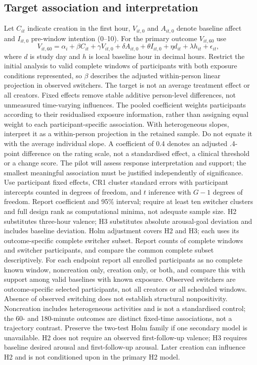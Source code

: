 \documentclass[11pt]{article}
\begin{document}
\subsection{Target association and interpretation}
Let $C_{it}$ indicate creation in the first hour, $V_{it,0}$ and $A_{it,0}$ denote baseline affect and $I_{it,0}$ pre-window intention (0--10). For the primary outcome $V_{it,60}$ use
\[
V_{it,60}=\alpha_i+\beta C_{it}+\gamma V_{it,0}+
\delta A_{it,0}+\theta I_{it,0}+\eta d_{it}+\lambda h_{it}+\epsilon_{it},
\]
where $d$ is study day and $h$ is local baseline hour in decimal hours. Restrict the initial analysis to valid complete windows of participants with both exposure conditions represented, so $\beta$ describes the adjusted within-person linear projection in observed switchers. The target is not an average treatment effect or all creators. Fixed effects remove stable additive person-level differences, not unmeasured time-varying influences. The pooled coefficient weights participants according to their residualised exposure information, rather than assigning equal weight to each participant-specific association. With heterogeneous slopes, interpret it as a within-person projection in the retained sample. Do not equate it with the average individual slope. A coefficient of 0.4 denotes an adjusted .4-point difference on the rating scale, not a standardised effect, a clinical threshold or a change score. The pilot will assess response interpretation and support; the smallest meaningful association must be justified independently of significance. Use participant fixed effects, CR1 cluster standard errors with participant intercepts counted in degrees of freedom, and $t$ inference with $G-1$ degrees of freedom. Report coefficient and 95\% interval; require at least ten switcher clusters and full design rank as computational minima, not adequate sample size. H2 substitutes three-hour valence; H3 substitutes absolute arousal-goal deviation and includes baseline deviation. Holm adjustment covers H2 and H3; each uses its outcome-specific complete switcher subset. Report counts of complete windows and switcher participants, and compare the common complete subset descriptively. For each endpoint report all enrolled participants as no complete known window, noncreation only, creation only, or both, and compare this with support among valid baselines with known exposure. Observed switchers are outcome-specific selected participants, not all creators or all scheduled windows. Absence of observed switching does not establish structural nonpositivity. Noncreation includes heterogeneous activities and is not a standardised control; the 60- and 180-minute outcomes are distinct fixed-time associations, not a trajectory contrast. Preserve the two-test Holm family if one secondary model is unavailable. H2 does not require an observed first-follow-up valence; H3 requires baseline desired arousal and first-follow-up arousal. Later creation can influence H2 and is not conditioned upon in the primary H2 model.
\end{document}
